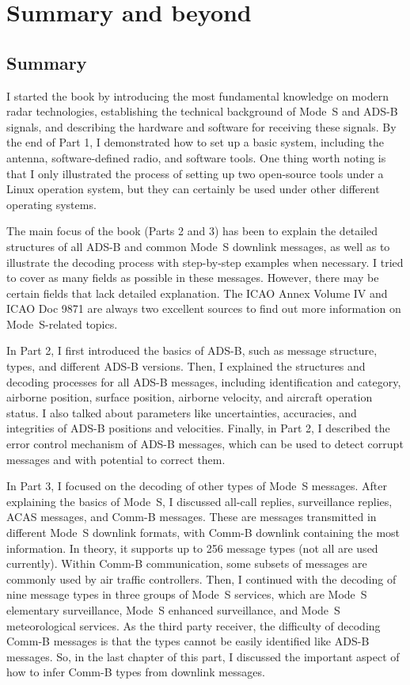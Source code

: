 \chapter{Summary and beyond}

\section{Summary}

I started the book by introducing the most fundamental knowledge on modern radar technologies, establishing the technical background of Mode~S and ADS-B signals, and describing the hardware and software for receiving these signals. By the end of Part 1, I demonstrated how to set up a basic system, including the antenna, software-defined radio, and software tools. One thing worth noting is that I only illustrated the process of setting up two open-source tools under a Linux operation system, but they can certainly be used under other different operating systems.

The main focus of the book (Parts 2 and 3) has been to explain the detailed structures of all ADS-B and common Mode~S downlink messages, as well as to illustrate the decoding process with step-by-step examples when necessary. I tried to cover as many fields as possible in these messages. However, there may be certain fields that lack detailed explanation. The ICAO Annex Volume IV and ICAO Doc 9871 are always two excellent sources to find out more information on Mode~S-related topics.

In Part 2, I first introduced the basics of ADS-B, such as message structure, types, and different ADS-B versions. Then, I explained the structures and decoding processes for all ADS-B messages, including identification and category, airborne position, surface position, airborne velocity, and aircraft operation status. I also talked about parameters like uncertainties, accuracies, and integrities of ADS-B positions and velocities. Finally, in Part 2, I described the error control mechanism of ADS-B messages, which can be used to detect corrupt messages and with potential to correct them.

In Part 3, I focused on the decoding of other types of Mode~S messages. After explaining the basics of Mode~S, I discussed all-call replies, surveillance replies, ACAS messages, and Comm-B messages. These are messages transmitted in different Mode~S downlink formats, with Comm-B downlink containing the most information. In theory, it supports up to 256 message types (not all are used currently). Within Comm-B communication, some subsets of messages are commonly used by air traffic controllers. Then, I continued with the decoding of nine message types in three groups of Mode~S services, which are Mode~S elementary surveillance, Mode~S enhanced surveillance, and Mode~S meteorological services. As the third party receiver, the difficulty of decoding Comm-B messages is that the types cannot be easily identified like ADS-B messages. So, in the last chapter of this part, I discussed the important aspect of how to infer Comm-B types from downlink messages.

